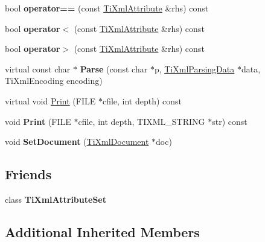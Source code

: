 \begin{DoxyCompactItemize}
bool {\bfseries operator==} (const \hyperlink{classTiXmlAttribute}{Ti\+Xml\+Attribute} \&rhs) const
\item 
\mbox{\label{classTiXmlAttribute_a80dcb758cc5ab27ce9865301e2da1335}} 
bool {\bfseries operator$<$} (const \hyperlink{classTiXmlAttribute}{Ti\+Xml\+Attribute} \&rhs) const
\item 
\mbox{\label{classTiXmlAttribute_a697c2dde7ac60fccaa7049cee906eb3e}} 
bool {\bfseries operator$>$} (const \hyperlink{classTiXmlAttribute}{Ti\+Xml\+Attribute} \&rhs) const
\item 
\mbox{\label{classTiXmlAttribute_ad62774421b814894b995af3b5d231dda}} 
virtual const char $\ast$ {\bfseries Parse} (const char $\ast$p, \hyperlink{classTiXmlParsingData}{Ti\+Xml\+Parsing\+Data} $\ast$data, Ti\+Xml\+Encoding encoding)
\item 
virtual void \hyperlink{classTiXmlAttribute_a68ae373e03b9c35be4c9d0c3c233b894}{Print} (F\+I\+LE $\ast$cfile, int depth) const
\item 
\mbox{\label{classTiXmlAttribute_a5c8f72a7d1a49972434d45f4c2889e0e}} 
void {\bfseries Print} (F\+I\+LE $\ast$cfile, int depth, T\+I\+X\+M\+L\+\_\+\+S\+T\+R\+I\+NG $\ast$str) const
\item 
\mbox{\label{classTiXmlAttribute_ac12a94d4548302afb12f488ba101f7d1}} 
void {\bfseries Set\+Document} (\hyperlink{classTiXmlDocument}{Ti\+Xml\+Document} $\ast$doc)
\end{DoxyCompactItemize}
\subsection*{Friends}
\begin{DoxyCompactItemize}
\item 
\mbox{\label{classTiXmlAttribute_a35a7b7f89f708527677d5078d41ce0bf}} 
class {\bfseries Ti\+Xml\+Attribute\+Set}
\end{DoxyCompactItemize}
\subsection*{Additional Inherited Members}


